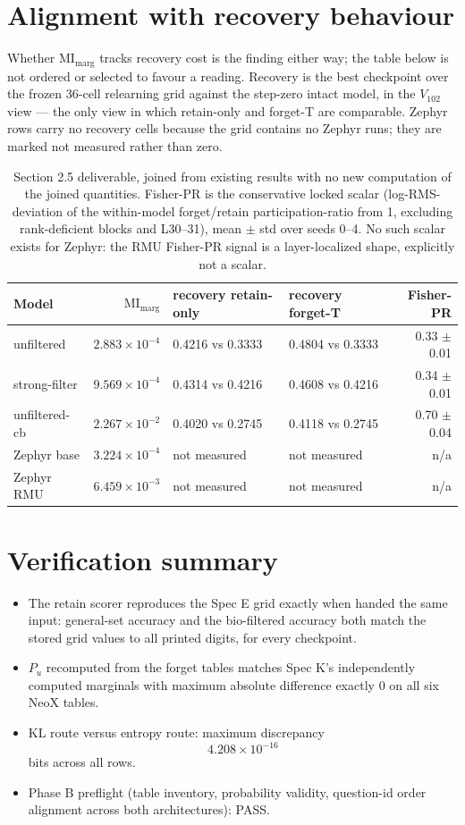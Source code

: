 \documentclass[11pt]{article}
\begin{document}
\section{Alignment with recovery behaviour}
Whether $\mathrm{MI}_{\mathrm{marg}}$ tracks recovery cost is the finding either
way; the table below is not ordered or selected to favour a reading. Recovery is the best
checkpoint over the frozen 36-cell relearning grid against the step-zero intact model, in the
$V_{102}$ view --- the only view in which retain-only and forget-T are comparable. Zephyr
rows carry no recovery cells because the grid contains no Zephyr runs; they are marked not
measured rather than zero.
\begin{table}[h]\centering\scriptsize
\begin{tabular}{lrllr}
\toprule
Model & $\mathrm{MI}_{\mathrm{marg}}$ & recovery retain-only & recovery forget-T & Fisher-PR\\
\midrule
unfiltered & $2.883\times10^{-4}$ & 0.4216 vs 0.3333 & 0.4804 vs 0.3333 & 0.33 $\pm$ 0.01\\
strong-filter & $9.569\times10^{-4}$ & 0.4314 vs 0.4216 & 0.4608 vs 0.4216 & 0.34 $\pm$ 0.01\\
unfiltered-cb & $2.267\times10^{-2}$ & 0.4020 vs 0.2745 & 0.4118 vs 0.2745 & 0.70 $\pm$ 0.04\\
Zephyr base & $3.224\times10^{-4}$ & not measured & not measured & n/a\\
Zephyr RMU & $6.459\times10^{-3}$ & not measured & not measured & n/a\\
\bottomrule\end{tabular}
\caption{Section 2.5 deliverable, joined from existing results with no new
computation of the joined quantities. Fisher-PR is the conservative locked scalar
(log-RMS-deviation of the within-model forget/retain participation-ratio from 1, excluding
rank-deficient blocks and L30--31), mean $\pm$ std over seeds 0--4. No such scalar exists for
Zephyr: the RMU Fisher-PR signal is a layer-localized shape, explicitly not a
scalar.}\label{tab:deliverable}
\end{table}
\section{Verification summary}
\begin{itemize}
\item The retain scorer reproduces the Spec E grid exactly when handed the same input: general-set accuracy and the bio-filtered accuracy both match the stored grid values to all printed digits, for every checkpoint.
\item $P_u$ recomputed from the forget tables matches Spec K's independently computed marginals with maximum absolute difference exactly $0$ on all six NeoX tables.
\item KL route versus entropy route: maximum discrepancy $$4.208\times10^{-16}$$ bits across all rows.
\item Phase B preflight (table inventory, probability validity, question-id order alignment across both architectures): PASS.
\end{itemize}
\end{document}
